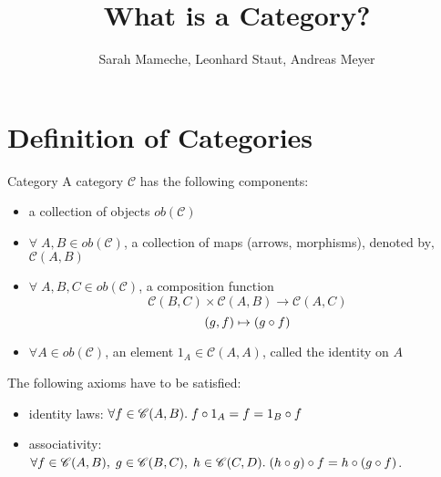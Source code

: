 
\def\pathToRoot{../}

\usepackage{charter}
\selectfont


\title{What is a Category?}
\author{Sarah Mameche, Leonhard Staut, Andreas Meyer}
\maketitle

\section {Definition of Categories}
\begin{definition}{Category}
	A category $\mathscr{C}$ has the following components:
	\begin{itemize}
		\item a collection of objects $ob(\mathscr{C})$
		\item $\forall \; A, B \in ob(\mathscr{C})$, a collection of maps (arrows, morphisms), denoted by‚ $\mathscr{C}(A, B)$
		\item $\forall \; A, B, C \in ob(\mathscr{C})$, a composition function
		\[\mathscr{C}(B, C) \times \mathscr{C}(A, B) \rightarrow  \mathscr{C}(A, C)
		\]		\[ (g,f) \mapsto (g \mathbin{\circ} f)
		\]
		\item $\forall A \in ob(\mathscr{C})$, an element $1_A \in \mathscr{C}(A, A)$, called the identity on $A$ 
 	\end{itemize}
 The following axioms have to be satisfied:
 \begin{itemize}
 	\item identity laws: $\forall f \in \mathscr{C}(A, B). \; f \mathbin{\circ} 1_A = f = 1_B \mathbin{\circ} f$ 
 	\item associativity: $\forall f \in \mathscr{C}(A, B), \; g \in \mathscr{C}(B, C), \; h \in \mathscr{C}(C, D). \; (h \mathbin{\circ} g) \mathbin{\circ} f = h \mathbin{\circ} (g \mathbin{\circ} f) $.
 \end{itemize}
\end{definition}

